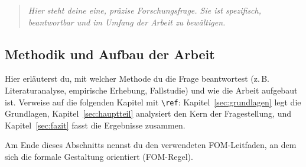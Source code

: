 \begin{quote}
  \itshape
  Hier steht deine eine, präzise Forschungsfrage. Sie ist spezifisch,
  beantwortbar und im Umfang der Arbeit zu bewältigen.
\end{quote}

\subsection{Methodik und Aufbau der Arbeit}
\label{subsec:methodik}

Hier erläuterst du, mit welcher Methode du die Frage beantwortest
(z.\,B. Literaturanalyse, empirische Erhebung, Fallstudie) und wie die Arbeit
aufgebaut ist. Verweise auf die folgenden Kapitel mit \verb|\ref|:
Kapitel~\ref{sec:grundlagen} legt die Grundlagen, Kapitel~\ref{sec:hauptteil}
analysiert den Kern der Fragestellung, und Kapitel~\ref{sec:fazit} fasst die
Ergebnisse zusammen.

Am Ende dieses Abschnitts nennst du den verwendeten FOM-Leitfaden, an dem sich
die formale Gestaltung orientiert (FOM-Regel).
